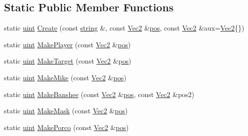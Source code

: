 \subsection*{Static Public Member Functions}
\begin{DoxyCompactItemize}
\item 
static \hyperlink{common_8hpp_a69aa29b598b851b0640aa225a9e5d61d}{uint} \hyperlink{class_game_object_ae36f0e72d06a7d559fad9178478f2e73}{Create} (const \hyperlink{_s_d_l__opengl__glext_8h_ae84541b4f3d8e1ea24ec0f466a8c568b}{string} \&, const \hyperlink{class_vec2}{Vec2} \&\hyperlink{class_game_object_a6973314aaec56412f367c0b55e7459b9}{pos}, const \hyperlink{class_vec2}{Vec2} \&aux=\hyperlink{class_vec2}{Vec2}\{\})
\item 
static \hyperlink{common_8hpp_a69aa29b598b851b0640aa225a9e5d61d}{uint} \hyperlink{class_game_object_a0e1d0d1e01776f327ced1420536e4190}{Make\-Player} (const \hyperlink{class_vec2}{Vec2} \&\hyperlink{class_game_object_a6973314aaec56412f367c0b55e7459b9}{pos})
\item 
static \hyperlink{common_8hpp_a69aa29b598b851b0640aa225a9e5d61d}{uint} \hyperlink{class_game_object_a481648a1616ecddcffa13b9fa6b09abf}{Make\-Target} (const \hyperlink{class_vec2}{Vec2} \&\hyperlink{class_game_object_a6973314aaec56412f367c0b55e7459b9}{pos})
\item 
static \hyperlink{common_8hpp_a69aa29b598b851b0640aa225a9e5d61d}{uint} \hyperlink{class_game_object_abadde38cdd933f2bc6a4945f7f09e203}{Make\-Mike} (const \hyperlink{class_vec2}{Vec2} \&\hyperlink{class_game_object_a6973314aaec56412f367c0b55e7459b9}{pos})
\item 
static \hyperlink{common_8hpp_a69aa29b598b851b0640aa225a9e5d61d}{uint} \hyperlink{class_game_object_a4d814fab441b7db5c711cd74f3f93a5d}{Make\-Banshee} (const \hyperlink{class_vec2}{Vec2} \&\hyperlink{class_game_object_a6973314aaec56412f367c0b55e7459b9}{pos}, const \hyperlink{class_vec2}{Vec2} \&pos2)
\item 
static \hyperlink{common_8hpp_a69aa29b598b851b0640aa225a9e5d61d}{uint} \hyperlink{class_game_object_ab0d27768f646ada70e63d49902e4e284}{Make\-Mask} (const \hyperlink{class_vec2}{Vec2} \&\hyperlink{class_game_object_a6973314aaec56412f367c0b55e7459b9}{pos})
\item 
static \hyperlink{common_8hpp_a69aa29b598b851b0640aa225a9e5d61d}{uint} \hyperlink{class_game_object_a01fde14c568979d7cdcf57ce284f25d1}{Make\-Porco} (const \hyperlink{class_vec2}{Vec2} \&\hyperlink{class_game_object_a6973314aaec56412f367c0b55e7459b9}{pos})
\end{DoxyCompactItemize}
